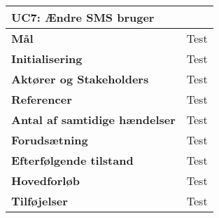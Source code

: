 \begin{table}[htbp] \centering
\begin{tabular}{|l|l|} %
	\hline
\multicolumn{2}{|l|}{\textbf{UC7: Ændre SMS bruger}} \\\hline
\textbf{Mål}								&Test \\\hline
\textbf{Initialisering}					&Test \\\hline
\textbf{Aktører og Stakeholders}			&Test \\\hline
\textbf{Referencer}						&Test \\\hline
\textbf{Antal af samtidige hændelser}	&Test \\\hline
\textbf{Forudsætning}					&Test \\\hline
\textbf{Efterfølgende tilstand}			&Test \\\hline
\textbf{Hovedforløb}						&Test \\\hline
\textbf{Tilføjelser}						&Test \\\hline
	\end{tabular}
	\label{UC7} 
\end{table}